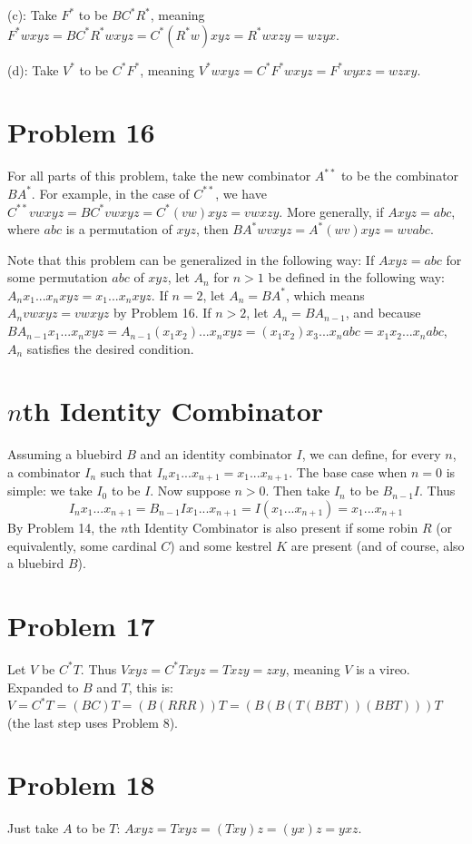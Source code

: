 \documentclass{article}
\theoremstyle{definition}
\begin{document}
(c): Take $F^*$ to be $BC^*R^*$, meaning $F^*wxyz=BC^*R^*wxyz=C^*(R^*w)xyz=R^*wxzy=wzyx$.


(d): Take $V^*$ to be $C^*F^*$, meaning $V^*wxyz=C^*F^*wxyz=F^*wyxz=wzxy$. 

\section*{Problem 16}
For all parts of this problem, take the new combinator $A^{**}$ to be the combinator $BA^*$. For example, in the case of $C^{**}$, we have 
$C^{**}vwxyz=BC^*vwxyz=C^*(vw)xyz=vwxzy$. More generally, if $Axyz=abc$, where $abc$ is a permutation of $xyz$, then $BA^*wvxyz=A^*(wv)xyz=wvabc$.


Note that this problem can be generalized in the following way: If $Axyz=abc$ for some permutation $abc$ of $xyz$, let $A_n$ for $n>1$ be defined in the following way:
$A_nx_1...x_nxyz=x_1...x_nxyz$. If $n=2$, let $A_n=BA^{*}$, which means $A_nvwxyz=vwxyz$ by Problem 16. If $n>2$, let $A_n=BA_{n-1}$, and because 
$BA_{n-1}x_1...x_nxyz=A_{n-1}(x_1x_2)...x_nxyz=(x_1x_2)x_3...x_nabc=x_1x_2...x_nabc$, $A_n$ satisfies the desired condition.

\section*{$n$th Identity Combinator}
Assuming a bluebird $B$ and an identity combinator $I$, we can define, for every $n$, a combinator $I_n$ such that $I_nx_1...x_{n+1}=x_1...x_{n+1}$. 
The base case when $n=0$ is simple: we take $I_0$ to be $I$. Now suppose $n>0$. Then take $I_n$ to be $B_{n-1}I$. Thus
\[ I_nx_1...x_{n+1}=B_{n-1}Ix_1...x_{n+1}=I(x_1...x_{n+1})=x_1...x_{n+1} \]
By Problem 14, the $n$th Identity Combinator is also present if some robin $R$ (or equivalently, some cardinal $C$) and some kestrel $K$ are present (and of course, 
also a bluebird $B$).

\section*{Problem 17}
Let $V$ be $C^*T$. Thus $Vxyz=C^*Txyz=Txzy=zxy$, meaning $V$ is a vireo. Expanded to $B$ and $T$, this is: 
$V=C^*T=(BC)T=(B(RRR))T=(B(B(T(BBT))(BBT)))T$ (the last step uses Problem 8).

\section*{Problem 18}
Just take $A$ to be $T$: $Axyz=Txyz=(Txy)z=(yx)z=yxz$.
\end{document}
